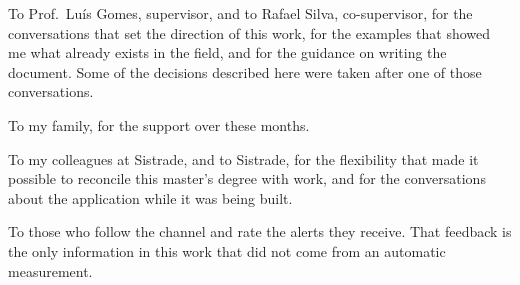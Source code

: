 %
\begin{acknowledgements}
To Prof.\ Luís Gomes, supervisor, and to Rafael Silva, co-supervisor, for the conversations
that set the direction of this work, for the examples that showed me what already exists in
the field, and for the guidance on writing the document. Some of the decisions described here
were taken after one of those conversations.

To my family, for the support over these months.

To my colleagues at Sistrade, and to Sistrade, for the flexibility that made it possible to
reconcile this master's degree with work, and for the conversations about the application
while it was being built.

To those who follow the channel and rate the alerts they receive. That feedback is the only
information in this work that did not come from an automatic measurement.
\end{acknowledgements}

